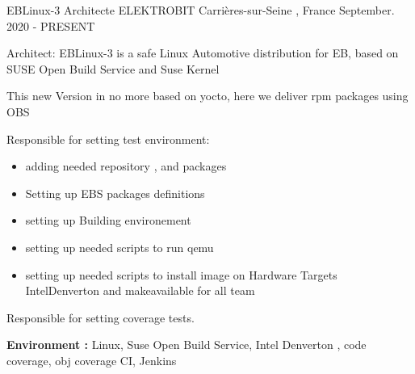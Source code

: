 \documentclass[11pt, a4paper]{awesome-cv} %
\begin{document}
\begin{cventries}


    \cventry
    {EBLinux-3 Architecte} %
    {ELEKTROBIT} %
    {Carrières-sur-Seine , France} %
    {September. 2020 - PRESENT} %
    { %
        \begin{cvitems}
            \item {Architect: EBLinux-3 is a safe Linux Automotive distribution for EB, based on SUSE Open Build Service and Suse Kernel}
            \item {This new Version in no more based on yocto, here we deliver rpm packages using OBS}
            \item {Responsible for setting test environment:}
            \begin{itemize}
                \item adding needed repository , and packages 
                \item Setting up EBS packages definitions   
                \item setting up Building environement 
                \item setting up needed scripts to run qemu 
                \item setting up needed scripts to install image  on Hardware Targets IntelDenverton and makeavailable for all team
              \end{itemize}
            \item {Responsible for setting coverage tests.}
            \item { \textbf{Environment :} Linux, Suse Open Build Service, Intel Denverton , code coverage, obj coverage CI, Jenkins}
        \end{cvitems}
    }


\end{cventries}
\end{document}
